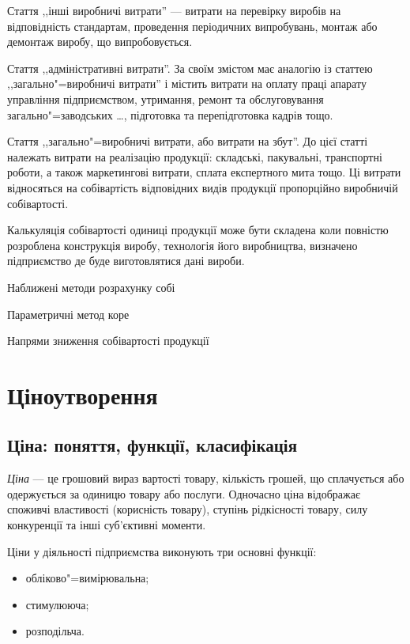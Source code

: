 \documentclass[a5paper,10pt,notitlepage,pdftex,headsepline]{scrartcl}
\begin{document}
  Стаття ,,інші виробничі витрати'' --- витрати на перевірку виробів на
  відповідність стандартам, проведення періодичних випробувань, монтаж або
  демонтаж виробу, що випробовується.

  Стаття ,,адміністративні витрати''.
  За своїм змістом має аналогію із статтею ,,загально"=виробничі витрати'' і
  містить витрати на оплату праці апарату управління підприємством, утримання,
  ремонт та обслуговування загально"=заводських \dots, підготовка та
  перепідготовка кадрів тощо.

  Стаття ,,загально"=виробничі витрати, або витрати на збут''.
  До цієї статті належать витрати на реалізацію продукції: складські,
  пакувальні, транспортні роботи, а також маркетингові витрати, сплата
  експертного мита тощо.
  Ці витрати відносяться на собівартість відповідних видів продукції
  пропорційно виробничій собівартості.

  Калькуляція собівартості одиниці продукції може бути складена коли повністю
  розроблена конструкція виробу, технологія його виробництва, визначено
  підприємство де буде виготовлятися дані вироби.

  Наближені методи розрахунку собі

    Параметричні
    метод коре

  Напрями зниження собівартості продукції

\section{Ціноутворення}
  \subsection{Ціна: поняття, функції, класифікація}
    \emph{Ціна} --- це грошовий вираз вартості товару, кількість грошей, що
    сплачується або одержується за одиницю товару або послуги.
    Одночасно ціна відображає споживчі властивості (корисність товару),
    ступінь рідкісності товару, силу конкуренції та інші суб’єктивні моменти.

    Ціни у діяльності підприємства виконують три основні функції:
    \begin{itemize}
      \item обліково"=вимірювальна;
      \item стимулююча;
      \item розподільча.
    \end{itemize}
\end{document}
